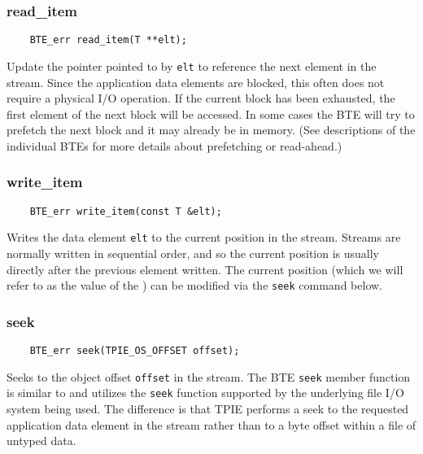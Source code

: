 \vspace*{\baselineskip}
\subsubsection{read\_item}

\begin{lstlisting}
    BTE_err read_item(T **elt);
\end{lstlisting}

\noindent
Update the pointer pointed to by \lstinline|elt| to reference the next
element in the stream. Since the application data elements are
blocked, this often does not require a physical I/O operation. If the
current block has been exhausted, the first element of the next block
will be accessed. In some cases the BTE will try to prefetch the next
block and it may already be in memory. (See descriptions of the
individual BTEs for more details about prefetching or read-ahead.)

\vspace*{\baselineskip}
\subsubsection{write\_item}

\begin{lstlisting}
    BTE_err write_item(const T &elt);
\end{lstlisting}

\noindent
Writes the data element \lstinline|elt| to the current position in the
stream. Streams are normally written in sequential order, and so the
current position is usually directly after the previous element
written. The current position (which we will refer to as the value of
the ) can be modified via the \lstinline|seek|
command below.

\vspace*{\baselineskip}
\subsubsection{seek}

\begin{lstlisting}
    BTE_err seek(TPIE_OS_OFFSET offset);
\end{lstlisting}

\noindent
Seeks to the object offset \lstinline|offset| in the stream. The BTE
\lstinline|seek| member function is similar to and utilizes the
\lstinline|seek| function supported by the underlying file I/O system
being used. The difference is that TPIE performs a seek to the
requested application data element in the stream rather than to a byte
offset within a file of untyped data.

